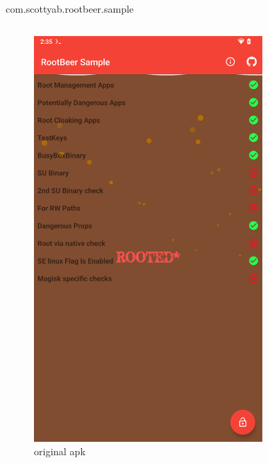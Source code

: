 \documentclass{beamer}
\begin{document}
\begin{frame}[fragile]{com.scottyab.rootbeer.sample}
    
    \begin{columns}
        \begin{figure}
            \centering
            \includegraphics[scale=0.07]{rootbeer.png}
            \caption{original apk}
            \end{figure}
            \begin{figure}

\end{figure}
\end{columns}
\end{frame}
\end{document}

